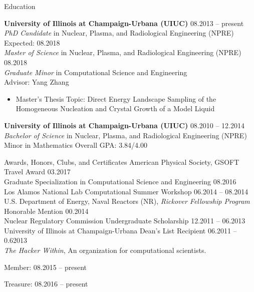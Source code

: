 \documentclass[9pt]{resume} %
\begin{document}

\begin{rSection}{Education}

{\bf University of Illinois at Champaign-Urbana (UIUC)} \hfill {08.2013 -- present} \\
{\it{PhD Candidate}} in Nuclear, Plasma, and Radiological Engineering (NPRE) \hfill{Expected: 08.2018}\\
{\it{Master of Science}} in Nuclear, Plasma, and Radiological Engineering (NPRE) \hfill{08.2018}\\
{\it{Graduate Minor}} in Computational Science and Engineering\\
Advisor: Yang Zhang
\begin{itemize}
	\item Master's Thesis Topic: Direct Energy Landscape Sampling of the Homogeneous Nucleation and Crystal Growth of a Model Liquid
\end{itemize}

{\bf University of Illinois at Champaign-Urbana (UIUC)} \hfill {08.2010 -- 12.2014} \\ 
{\it Bachelor of Science} in Nuclear, Plasma, and Radiological Engineering (NPRE) \\
Minor in Mathematics \hfill{Overall GPA: 3.84/4.00}
\end{rSection}

\begin{rSection}{Awards, Honors, Clubs, and Certificates}
	American Physical Society, GSOFT Travel Award \hfill{03.2017}
	\\
	Graduate Specialization in Computational Science and Engineering \hfill{08.2016}
	\\
	Los Alamos National Lab Computational Summer Workshop \hfill{06.2014 -- 08.2014}
	\\
	U.S. Department of Energy, Naval Reactors (NR), {\it Rickover Fellowship Program} Honorable Mention \hfill{00.2014} 
	\\
	{ Nuclear Regulatory Commission Undergraduate Scholarship} \hfill{12.2011 -- 06.2013}
	\\
	University of Illinois at Champaign-Urbana Dean's List Recipient \hfill{06.2011 -- 0.62013}
	\\
	{\it{The Hacker Within}}, An organization for computational scientists.
	\strut\hfill {Member:   08.2015 -- present}\\
	\strut\hfill Treasure: 08.2016 -- present
\end{rSection}
\end{document}
